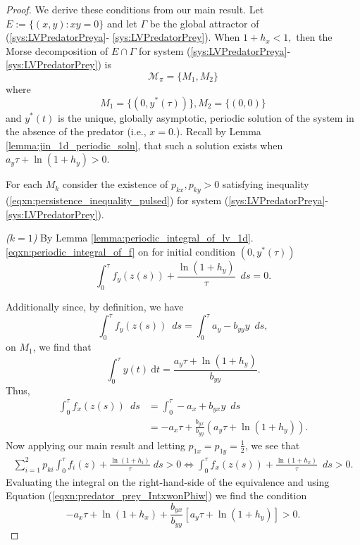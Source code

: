 \documentclass{article}
\theoremstyle{definition}
\newcommand{\rd}{\text{d}}
\begin{document}
\begin{proof}
We derive these conditions from our main result. Let $E := \{(x,y): xy =0\}$ and let $\Gamma$ be the global attractor of (\ref{sys:LVPredatorPreya}- \ref{sys:LVPredatorPrey}). When $1 + h_x < 1,$ then the Morse decomposition of $E \cap \Gamma$ for system (\ref{sys:LVPredatorPreya}- \ref{sys:LVPredatorPrey}) is 
$$
\mathcal{M_\pi} = \{M_1, M_2 \}
$$
where 
$$
M_1 =\{(0, y^*(\tau))\}, M_2 = \{(0,0)\}
$$
and $y^*(t)$ is the unique, globally asymptotic, periodic solution of the system in the absence of the predator (i.e., $x = 0.$). Recall by Lemma \ref{lemma:jin_1d_periodic_soln}, that such a solution exists when $a_y\tau + \ln(1 + h_y) > 0$. 

For each $M_k$ consider the existence of $p_{kx}, p_{ky} > 0$ satisfying inequality (\ref{eqxn:persistence_inequality_pulsed}) for system (\ref{sys:LVPredatorPreya}- \ref{sys:LVPredatorPrey}).

\textit{($k=1$)}
By Lemma \ref{lemma:periodic_integral_of_lv_1d}.\ref{eqxn:periodic_integral_of_f} on for initial condition $(0,y^*(\tau))$ 
$$ \int_0^\tau f_y(z(s)) + \frac{\ln(1 + h_y)}{\tau} \ \;d s = 0.$$ 

Additionally since, by definition, we have
$$\int_0^\tau f_y(z(s)) \ \; d s = \int_0^\tau a_y - b_{yy}y \ \;d s,$$
on $M_1$, we find that
\begin{equation}
\int_0^\tau y(t) \ \rd t = \frac{a_y\tau + \ln(1 + h_y)}{b_{yy}}.
\end{equation}
Thus, 
\begin{equation}\label{eqxn:predator_prey_IntxwonPhiw}
\begin{split}
\int_0^\tau f_x(z(s)) \ \;d s &= \int_0^\tau -a_x + b_{yx} y \ \; d s \\
&= -a_x\tau + \frac{b_{yx}}{b_{yy}}(a_y\tau + \ln(1 + h_y)). 
\end{split}
\end{equation}
Now applying our main result and letting $p_{1x} = p_{1y} = \frac{1}{2}$, we see that 
\begin{equation} 
\begin{split}
\sum^2_{i=1} p_{ki} \int_0^{\tau} f_i(z) + \frac{\ln{(1+h_i)}}{\tau} \; ds > 0 \iff \int_0^{\tau} f_x(z(s)) + \frac{\ln(1 + h_x)}{\tau} \ \; d s > 0.
\end{split} 
\end{equation}
Evaluating the integral on the right-hand-side of the equivalence and using Equation (\ref{eqxn:predator_prey_IntxwonPhiw}) we find the condition
\begin{equation} \label{eqxn:predator_prey_full_perm_condition}
-a_x \tau + \ln(1 + h_x) + \frac{b_{yx}}{b_{yy}}\left[a_y \tau + \ln(1 + h_y )\right] > 0.
\end{equation}


\end{proof}
\end{document}
